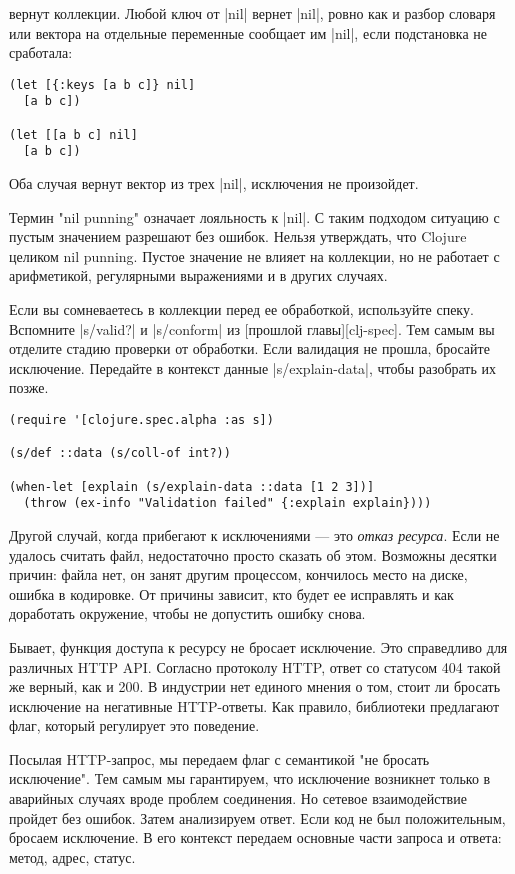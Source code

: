 вернут коллекции. Любой ключ от \spverb|nil| вернет \spverb|nil|, ровно как и разбор словаря
или вектора на отдельные переменные сообщает им \spverb|nil|, если подстановка не
сработала:

\begin{verbatim}
(let [{:keys [a b c]} nil]
  [a b c])

(let [[a b c] nil]
  [a b c])
\end{verbatim}

Оба случая вернут вектор из трех \spverb|nil|, исключения не произойдет.

Термин "nil punning" означает лояльность к \spverb|nil|. С таким подходом ситуацию с
пустым значением разрешают без ошибок. Нельзя утверждать, что Clojure целиком
nil punning. Пустое значение не влияет на коллекции, но не работает с
арифметикой, регулярными выражениями и в других случаях.

Если вы сомневаетесь в коллекции перед ее обработкой, используйте
спеку. Вспомните \spverb|s/valid?| и \spverb|s/conform| из [прошлой главы][clj-spec]. Тем
самым вы отделите стадию проверки от обработки. Если валидация не прошла,
бросайте исключение. Передайте в контекст данные \spverb|s/explain-data|, чтобы
разобрать их позже.

\begin{verbatim}
(require '[clojure.spec.alpha :as s])

(s/def ::data (s/coll-of int?))

(when-let [explain (s/explain-data ::data [1 2 3])]
  (throw (ex-info "Validation failed" {:explain explain})))
\end{verbatim}

Другой случай, когда прибегают к исключениями — это \emph{отказ ресурса}. Если не
удалось считать файл, недостаточно просто сказать об этом. Возможны десятки
причин: файла нет, он занят другим процессом, кончилось место на диске, ошибка в
кодировке. От причины зависит, кто будет ее исправлять и как доработать
окружение, чтобы не допустить ошибку снова.

Бывает, функция доступа к ресурсу не бросает исключение. Это справедливо для
различных HTTP API. Согласно протоколу HTTP, ответ со статусом 404 такой же
верный, как и 200. В индустрии нет единого мнения о том, стоит ли бросать
исключение на негативные HTTP-ответы. Как правило, библиотеки предлагают флаг,
который регулирует это поведение.

Посылая HTTP-запрос, мы передаем флаг с семантикой "не бросать исключение". Тем
самым мы гарантируем, что исключение возникнет только в аварийных случаях вроде
проблем соединения. Но сетевое взаимодействие пройдет без ошибок. Затем
анализируем ответ. Если код не был положительным, бросаем исключение. В его
контекст передаем основные части запроса и ответа: метод, адрес, статус.

